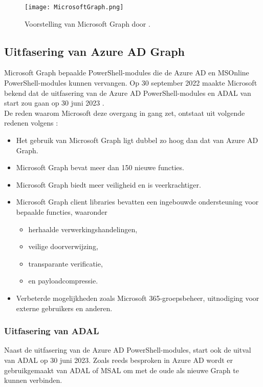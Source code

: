 \begin{figure}[h]
    \texttt{[image: MicrosoftGraph.png]}
    \caption[Voorbeeld Microsoft Graph]{Voorstelling van Microsoft Graph door \textcite{Microsoft2023d}.}
    \label{msg}
\end{figure}

\subsection{Uitfasering van Azure AD Graph}
 
Microsoft Graph bepaalde PowerShell-modules die de Azure \ac{AD} en MSOnline PowerShell-modules kunnen vervangen. Op 30 september 2022 maakte Microsoft bekend dat de uitfasering van de Azure \ac{AD} PowerShell-modules en \ac{ADAL} van start zou gaan op 30 juni 2023 \autocite{Sahay2022}. \\

De reden waarom Microsoft deze overgang in gang zet, ontstaat uit volgende redenen volgens \textcite{Microsoft2023e}:

\begin{itemize}
    \item Het gebruik van Microsoft Graph ligt dubbel zo hoog dan dat van Azure \ac{AD} Graph.
    \item Microsoft Graph bevat meer dan 150 nieuwe functies.
    \item Microsoft Graph biedt meer veiligheid en is veerkrachtiger.
    \item Microsoft Graph client libraries bevatten een ingebouwde ondersteuning voor bepaalde functies, waaronder
    \begin{itemize}
        \item herhaalde verwerkingshandelingen,
        \item veilige doorverwijzing,
        \item transparante verificatie,
        \item en payloadcompressie.
    \end{itemize}
    \item Verbeterde mogelijkheden zoals Microsoft 365-groepsbeheer, uitnodiging voor externe gebruikers en anderen.
\end{itemize} 

\subsubsection{Uitfasering van ADAL}

Naast de uitfasering van de Azure \ac{AD} PowerShell-modules, start ook de uitval van \ac{ADAL} op 30 juni 2023. Zoals reeds besproken in Azure \ac{AD} wordt er gebruikgemaakt van \ac{ADAL} of \ac{MSAL} om met de oude als nieuwe Graph te kunnen verbinden. \\

